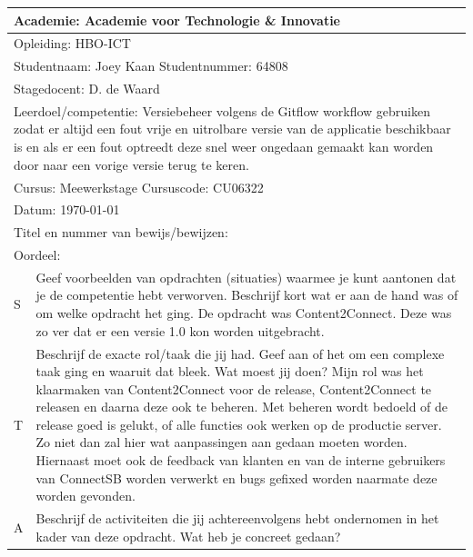 \begin{tabularx}{\textwidth}{| l | X |}
\hline
\multicolumn{2}{|l|}{Academie: Academie voor Technologie \& Innovatie } \\
\hline
\multicolumn{2}{|l|}{Opleiding: HBO-ICT } \\
\hline
\multicolumn{2}{|l|}{Studentnaam: Joey Kaan \hspace{35pt} Studentnummer: 64808} \\
\hline
\multicolumn{2}{|l|}{Stagedocent: D. de Waard} \\
\hline
\multicolumn{2}{|p{\textwidth-1in}|}{Leerdoel/competentie: Versiebeheer volgens de Gitflow workflow gebruiken zodat er
altijd een fout vrije en uitrolbare versie van de applicatie beschikbaar is en als
er een fout optreedt deze snel weer ongedaan gemaakt kan worden door naar
een vorige versie terug te keren.} \\
\hline
\multicolumn{2}{|l|}{Cursus: Meewerkstage \hspace{35pt} Cursuscode: CU06322} \\
\hline
\multicolumn{2}{|l|}{Datum: \today} \\
\hline
\multicolumn{2}{|l|}{Titel en nummer van bewijs/bewijzen: } \\ [50pt]
\hline
\multicolumn{2}{|l|}{Oordeel: } \\
\hline
S & Geef voorbeelden van opdrachten (situaties) waarmee je kunt aantonen dat je de competentie hebt verworven. Beschrijf kort wat er aan de hand was of om welke opdracht het ging.
\newline
\newline
De opdracht was Content2Connect. Deze was zo ver dat er een versie 1.0 kon worden uitgebracht. \\
\hline
T & Beschrijf de exacte rol/taak die jij had. Geef aan of het om een complexe taak ging en waaruit dat bleek. Wat moest jij doen?
\newline
\newline
Mijn rol was het klaarmaken van Content2Connect voor de release, Content2Connect te releasen en daarna deze ook te beheren. Met beheren wordt bedoeld of de release goed is gelukt, of alle functies ook werken op de productie server. Zo niet dan zal hier wat aanpassingen aan gedaan moeten worden. Hiernaast moet ook de feedback van klanten en van de interne gebruikers van ConnectSB worden verwerkt en bugs gefixed worden naarmate deze worden gevonden.
\\
\hline
A & Beschrijf de activiteiten die jij achtereenvolgens hebt ondernomen in het kader van deze opdracht. Wat heb je concreet gedaan?

\end{tabularx}
